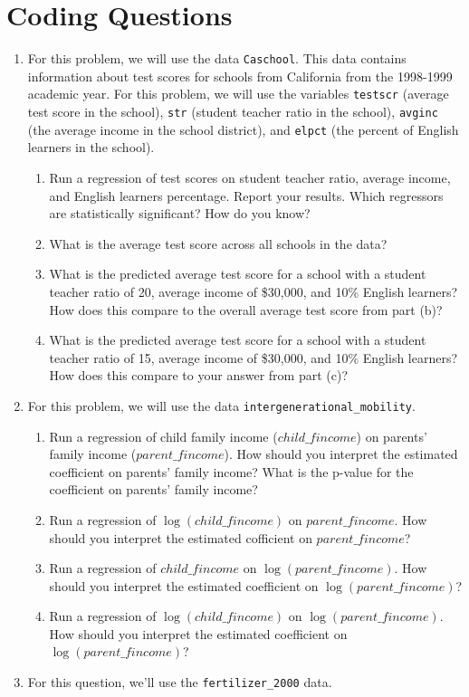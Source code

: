 \documentclass[
  letterpaper,
  DIV=11,
  numbers=noendperiod]{scrreprt}
\begin{document}
\section{Coding Questions}\label{coding-questions-2}

\begin{enumerate}
\def\labelenumi{\arabic{enumi}.}
\item
  For this problem, we will use the data \texttt{Caschool}. This data
  contains information about test scores for schools from California
  from the 1998-1999 academic year. For this problem, we will use the
  variables \texttt{testscr} (average test score in the school),
  \texttt{str} (student teacher ratio in the school), \texttt{avginc}
  (the average income in the school district), and \texttt{elpct} (the
  percent of English learners in the school).

  \begin{enumerate}
  \def\labelenumii{\alph{enumii})}
  \item
    Run a regression of test scores on student teacher ratio, average
    income, and English learners percentage. Report your results. Which
    regressors are statistically significant? How do you know?
  \item
    What is the average test score across all schools in the data?
  \item
    What is the predicted average test score for a school with a student
    teacher ratio of 20, average income of \$30,000, and 10\% English
    learners? How does this compare to the overall average test score
    from part (b)?
  \item
    What is the predicted average test score for a school with a student
    teacher ratio of 15, average income of \$30,000, and 10\% English
    learners? How does this compare to your answer from part (c)?
  \end{enumerate}
\item
  For this problem, we will use the data
  \texttt{intergenerational\_mobility}.

  \begin{enumerate}
  \def\labelenumii{\alph{enumii})}
  \item
    Run a regression of child family income (\(child\_fincome\)) on
    parents' family income (\(parent\_fincome\)). How should you
    interpret the estimated coefficient on parents' family income? What
    is the p-value for the coefficient on parents' family income?
  \item
    Run a regression of \(\log(child\_fincome)\) on \(parent\_fincome\).
    How should you interpret the estimated cofficient on
    \(parent\_fincome\)?
  \item
    Run a regression of \(child\_fincome\) on \(\log(parent\_fincome)\).
    How should you interpret the estimated coefficient on
    \(\log(parent\_fincome)\)?
  \item
    Run a regression of \(\log(child\_fincome)\) on
    \(\log(parent\_fincome)\). How should you interpret the estimated
    coefficient on \(\log(parent\_fincome)\)?
  \end{enumerate}
\item
  For this question, we'll use the \texttt{fertilizer\_2000} data.


\end{enumerate}
\end{document}
